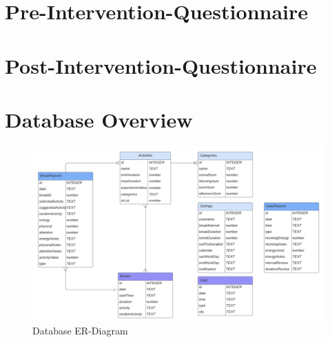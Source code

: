 \documentclass{hasel_thesis}
\begin{document}
\chapter{Pre-Intervention-Questionnaire} \label{pre-intervention-questionnaire}


\chapter{Post-Intervention-Questionnaire} \label{post-intervention-questionnaire}


\chapter{Database Overview} \label{fig:database}

\begin{figure}[htp]
    \centering
    \includegraphics[width=15cm]{hasel_thesis/images/db.png}
    \caption{Database ER-Diagram}
    \label{fig:db}
\end{figure}
\end{document}
